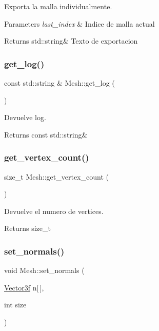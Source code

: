 Exporta la malla individualmente. 


\begin{DoxyParams}{Parameters}
{\em last\+\_\+index} & Indice de malla actual \\
\hline
\end{DoxyParams}
\begin{DoxyReturn}{Returns}
std\+::string\& Texto de exportacion 
\end{DoxyReturn}
\mbox{\label{class_mesh_a7ac61f854653c3b6e0096252b2751588}} 
\subsubsection{\texorpdfstring{get\_log()}{get\_log()}}
{\footnotesize\ttfamily const std\+::string \& Mesh\+::get\+\_\+log (\begin{DoxyParamCaption}{ }\end{DoxyParamCaption})}



Devuelve log. 

\begin{DoxyReturn}{Returns}
const std\+::string\& 
\end{DoxyReturn}
\mbox{\label{class_mesh_a6e64ec108d5b2e8f53b8b22dc1ba52af}} 
\subsubsection{\texorpdfstring{get\_vertex\_count()}{get\_vertex\_count()}}
{\footnotesize\ttfamily size\+\_\+t Mesh\+::get\+\_\+vertex\+\_\+count (\begin{DoxyParamCaption}{ }\end{DoxyParamCaption})}



Devuelve el numero de vertices. 

\begin{DoxyReturn}{Returns}
size\+\_\+t 
\end{DoxyReturn}
\mbox{\label{class_mesh_a946e8b63ad2870c169364fc9399dcfaa}} 
\subsubsection{\texorpdfstring{set\_normals()}{set\_normals()}}
{\footnotesize\ttfamily void Mesh\+::set\+\_\+normals (\begin{DoxyParamCaption}\item[{\mbox{\hyperlink{structmathexp_1_1_vector3f}{Vector3f}}}]{n\mbox{[}$\,$\mbox{]},  }\item[{int}]{size }\end{DoxyParamCaption})}



